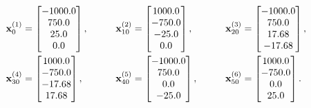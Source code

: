 \begin{alignat}{3}\label{eq:c2-init-states}
    \svecat{x}{0}{(1)} &= \begin{bmatrix}
        -1000.0 \\
        750.0 \\
        25.0 \\
        0.0
    \end{bmatrix},
    &\qquad
    \svecat{x}{10}{(2)} &= \begin{bmatrix}
        1000.0 \\
        -750.0 \\
        -25.0 \\
        0.0
    \end{bmatrix},
    &\qquad
    \svecat{x}{20}{(3)} &= \begin{bmatrix}
        -1000.0 \\
        750.0 \\
        17.68 \\
        -17.68
    \end{bmatrix},
    \nonumber \\
    \svecat{x}{30}{(4)} &= \begin{bmatrix}
        1000.0 \\
        -750.0 \\
        -17.68 \\
        17.68
    \end{bmatrix},
    &\qquad
    \svecat{x}{40}{(5)} &= \begin{bmatrix}
        -1000.0 \\
        750.0 \\
        0.0 \\
        -25.0
    \end{bmatrix},
    &\qquad
    \svecat{x}{50}{(6)} &= \begin{bmatrix}
        1000.0 \\
        -750.0 \\
        0.0 \\
        25.0
    \end{bmatrix}.
\end{alignat}


